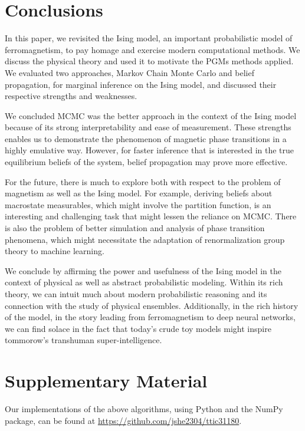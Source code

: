\documentclass{article}
\begin{document}
\section{Conclusions}
%
%
%
%
%
In this paper, we revisited the Ising model, an important probabilistic model of 
ferromagnetism, to pay homage and exercise modern computational methods. 
We discuss the physical theory and used it to motivate the PGMs methods applied. 
We evaluated two approaches, Markov Chain Monte Carlo and belief propagation, 
for marginal inference on the Ising model, and discussed their respective 
strengths and weaknesses. 

We concluded MCMC was the better approach in the context of the Ising model 
because of its strong interpretability and ease of measurement. 
These strengths enables us to demonstrate the phenomenon of magnetic phase 
transitions in a highly emulative way. 
However, for faster inference that is interested in the true equilibrium beliefs 
of the system, belief propagation may prove more effective. 

For the future, there is much to explore both with respect to the problem of 
magnetism as well as the Ising model. 
For example, deriving beliefs about macrostate measurables, which might involve 
the partition function, is an interesting and challenging task that might lessen 
the reliance on MCMC. 
There is also the problem of better simulation and analysis of phase transition 
phenomena, which might necessitate the adaptation of renormalization group 
theory to machine learning. 

We conclude by affirming the power and usefulness of the Ising model in the 
context of physical as well as abstract probabilistic modeling. 
Within its rich theory, we can intuit much about modern probabilistic 
reasoning and its connection with the study of physical ensembles. 
Additionally, in the rich history of the model, in the story leading from 
ferromagnetism to deep neural networks, we can find solace in the fact that 
today's crude toy models might inspire tommorow's transhuman super-intelligence. 
%
%
%
%
%
\section{Supplementary Material}
%
%
%
%
%
Our implementations of the above algorithms, using Python and the NumPy package, 
can be found at \url{https://github.com/jshe2304/ttic31180}. 



\end{document}
